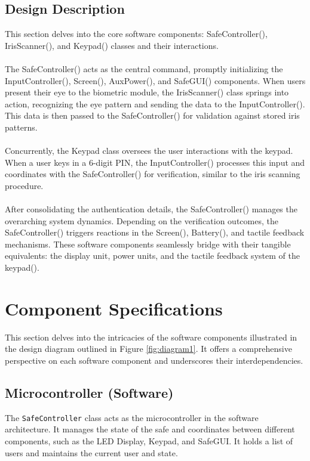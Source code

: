 \documentclass{article}
\begin{document}
\subsection{Design Description}
This section delves into the core software components: SafeController(), IrisScanner(), and Keypad() classes and their interactions. \\ \\
The SafeController() acts as the central command, promptly initializing the InputController(), Screen(), AuxPower(), and SafeGUI() components. When users present their eye to the biometric module, the IrisScanner() class springs into action, recognizing the eye pattern and sending the data to the InputController(). This data is then passed to the SafeController() for validation against stored iris patterns. \\ \\
Concurrently, the Keypad class oversees the user interactions with the keypad. When a user keys in a 6-digit PIN, the InputController() processes this input and coordinates with the SafeController() for verification, similar to the iris scanning procedure. \\ \\
After consolidating the authentication details, the SafeController() manages the overarching system dynamics. Depending on the verification outcomes, the SafeController() triggers reactions in the Screen(), Battery(), and tactile feedback mechanisms. These software components seamlessly bridge with their tangible equivalents: the display unit, power units, and the tactile feedback system of the keypad().

\section{Component Specifications}
This section delves into the intricacies of the software components illustrated in the design diagram outlined in Figure \ref{fig:diagram1}. It offers a comprehensive perspective on each software component and underscores their interdependencies.

\subsection{Microcontroller (Software)}
The \texttt{SafeController} class acts as the microcontroller in the software architecture. It manages the state of the safe and coordinates between different components, such as the LED Display, Keypad, and SafeGUI. It holds a list of users and maintains the current user and state.
\end{document}

